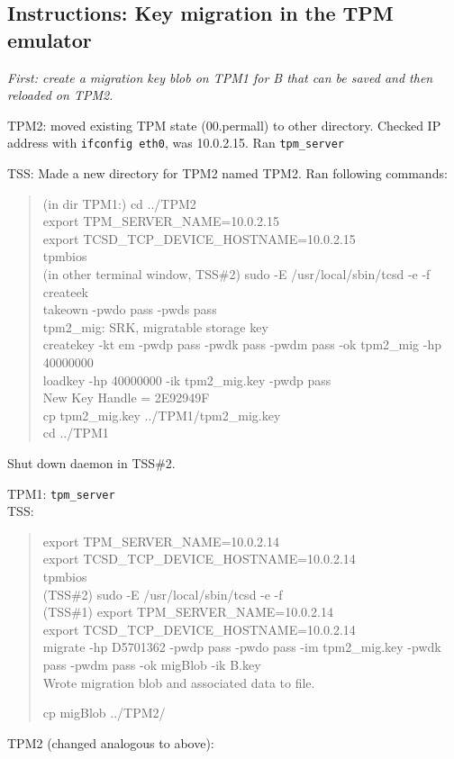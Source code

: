 \documentclass[10pt]{article}
\newcommand{\command}[1]{\texttt{#1}}
\begin{document}
\subsection{Instructions: Key migration in the TPM emulator}
\textit{First: create a migration key blob on TPM1 for B that can be saved and then reloaded on TPM2.}

TPM2: moved existing TPM state (00.permall) to other directory. Checked IP address with \command{ifconfig eth0}, was 10.0.2.15. Ran \command{tpm\_server}

TSS: Made a new directory for TPM2 named TPM2. Ran following commands: \\
\begin{quote}
(in dir TPM1:) cd ../TPM2 \\
export TPM\_SERVER\_NAME=10.0.2.15 \\
export TCSD\_TCP\_DEVICE\_HOSTNAME=10.0.2.15 \\
tpmbios \\
(in other terminal window, TSS\#2) sudo -E /usr/local/sbin/tcsd -e -f \\

createek \\
takeown -pwdo pass -pwds pass\\

tpm2\_mig: SRK, migratable storage key \\
createkey -kt em -pwdp pass -pwdk pass -pwdm pass -ok tpm2\_mig -hp 40000000\\
loadkey -hp 40000000 -ik tpm2\_mig.key -pwdp pass\\
New Key Handle =  2E92949F\\

cp tpm2\_mig.key ../TPM1/tpm2\_mig.key \\
cd ../TPM1
\end{quote}

Shut down daemon in TSS\#2.

TPM1:  \command{tpm\_server } \\

TSS: \\
\begin{quote}
export TPM\_SERVER\_NAME=10.0.2.14 \\
export TCSD\_TCP\_DEVICE\_HOSTNAME=10.0.2.14 \\
tpmbios \\
(TSS\#2) sudo -E /usr/local/sbin/tcsd -e -f \\

(TSS\#1) export TPM\_SERVER\_NAME=10.0.2.14 \\
export TCSD\_TCP\_DEVICE\_HOSTNAME=10.0.2.14 \\

migrate -hp D5701362 -pwdp pass -pwdo pass -im tpm2\_mig.key -pwdk pass -pwdm pass -ok migBlob -ik B.key\\
Wrote migration blob and associated data to file.

cp migBlob ../TPM2/

\end{quote}
TPM2 (changed analogous to above):
\end{document}

